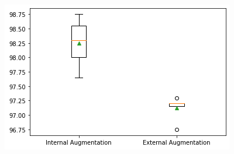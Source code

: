 \documentclass{article}
\begin{document}
\begin{figure}[!htb]
  \includegraphics[width=\linewidth]{figure/aug_test_1.png}


\end{figure}
\end{document}

